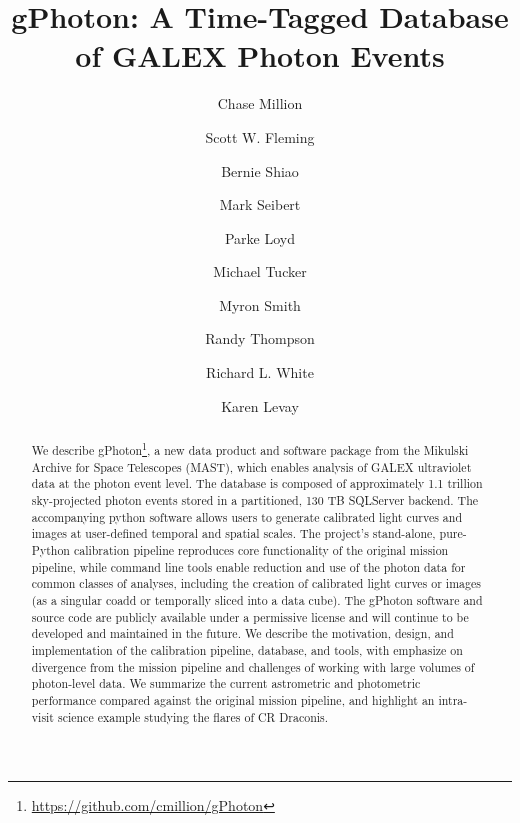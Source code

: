 \documentclass[5p]{elsarticle}
\begin{document}
\begin{frontmatter}
\title{gPhoton: A Time-Tagged Database of GALEX Photon Events}

\author[millionconcepts]{Chase Million}

\author[stsci,csc]{Scott W. Fleming}
\author[stsci]{Bernie Shiao}
\author[carnegie]{Mark Seibert}
\author[ucolorado]{Parke Loyd}
\author[appstate]{Michael Tucker}
\author[stsci]{Myron Smith}
\author[stsci,csc]{Randy Thompson}
\author[stsci]{Richard L. White}
\author[stsci,csc]{Karen Levay}

\address[millionconcepts]{Million Concepts LLC, 2204 Mountain View Ave., State College, PA 16801, USA}
\address[stsci]{Space Telescope Science Institute, 3700 San Martin Dr, Baltimore, MD 21218, USA}
\address[csc]{Computer Sciences Corporation, 3700 San Martin Dr, Baltimore, MD 21218, USA}
\address[carnegie]{The Observatories of the Carnegie Institution of Washington, 813 Santa Barbara Street, Pasadena, CA 91101, USA}
\address[ucolorado]{Department of Astrophysics and Planetary Science, University of Colorado, Boulder CO}
\address[appstate]{Dept. of Physics and Astronomy, Appalachian State University, Boone, NC 28608, USA}

\addtocounter{footnote}{1}

\begin{abstract}
We describe gPhoton\footnote{\url{https://github.com/cmillion/gPhoton}}, a new data product and software package from the Mikulski Archive for Space Telescopes (MAST), which enables analysis of GALEX ultraviolet data at the photon event level.  The database is composed of approximately 1.1 trillion sky-projected photon events stored in a partitioned, 130 TB SQLServer backend.  The accompanying python software allows users to generate calibrated light curves and images at user-defined temporal and spatial scales. The project's stand-alone, pure-Python calibration pipeline reproduces core functionality of the original mission pipeline, while command line tools enable reduction and use of the photon data for common classes of analyses, including the creation of calibrated light curves or images (as a singular coadd or temporally sliced into a data cube). The gPhoton software and source code are publicly available under a permissive license and will continue to be developed and maintained in the future. We describe the motivation, design, and implementation of the calibration pipeline, database, and tools, with emphasize on divergence from the mission pipeline and challenges of working with large volumes of photon-level data.  We summarize the current astrometric and photometric performance compared against the original mission pipeline, and highlight an intra-visit science example studying the flares of CR Draconis.
\end{abstract}

\end{frontmatter}
\end{document}
